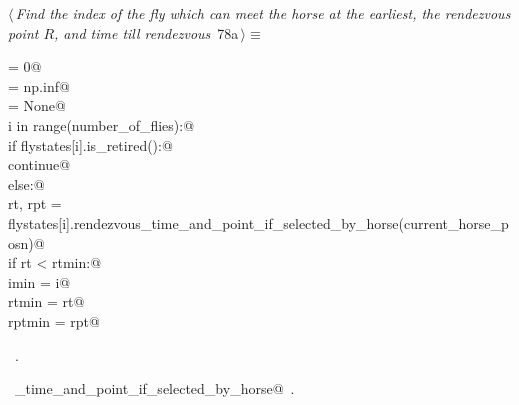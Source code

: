 \documentclass[11.5pt]{report}
\begin{document}
\begin{flushleft} \small
\begin{minipage}{\linewidth}\label{scrap117}\raggedright\small
{} $\langle\,${\itshape Find the index of the fly  which can meet the horse at the earliest, the rendezvous point $R$, and time till rendezvous}\nobreak\ {\footnotesize {78a}}$\,\rangle\equiv$
\vspace{-1ex}
\begin{list}{}{} \item
\mbox{}\verb@imin  = 0@\\
\mbox{}\verb@rtmin = np.inf@\\
\mbox{}\verb@rptmin= None@\\
\mbox{}\verb@for i in range(number_of_flies):@\\
\mbox{}\verb@     if flystates[i].is_retired():@\\
\mbox{}\verb@         continue@\\
\mbox{}\verb@     else:@\\
\mbox{}\verb@         rt, rpt = flystates[i].rendezvous_time_and_point_if_selected_by_horse(current_horse_posn)@\\
\mbox{}\verb@         if rt < rtmin:@\\
\mbox{}\verb@             imin   = i@\\
\mbox{}\verb@             rtmin  = rt@\\
\mbox{}\verb@             rptmin = rpt@\\
\mbox{}\verb@@{\NWsep}
\end{list}
\vspace{-1.5ex}
\footnotesize
\begin{list}{}{\setlength{\itemsep}{-\parsep}\setlength{\itemindent}{-\leftmargin}}
\item \NWtxtMacroRefIn\ .
\item \NWtxtIdentsUsed\nobreak\  \verb@rendezvous_time_and_point_if_selected_by_horse@\nobreak\ .
\item{}
\end{list}
\end{minipage}\vspace{4ex}
\end{flushleft}
\end{document}
